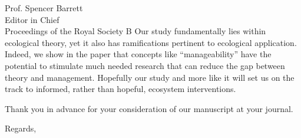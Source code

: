\documentclass[12pt]{letter}
\begin{document}
\begin{letter}{
       Prof. Spencer Barrett\\
       Editor in Chief\\
       Proceedings of the Royal Society B}
Our study fundamentally lies within ecological theory, yet it also has ramifications pertinent to ecological application. 
Indeed, we show in the paper that concepts like ``manageability'' have the potential to stimulate much needed research that can reduce the gap between theory and management.
Hopefully our study and more like it will set us on the track to informed, rather than hopeful, ecosystem interventions. 

Thank you in advance for your consideration of our manuscript at your journal.

\closing{Regards,}

\end{letter}
\end{document}
